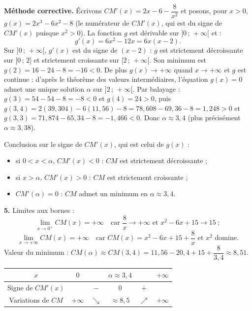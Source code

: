 \documentclass[11pt]{article}
\begin{document}
\begin{exoresolu}
\medskip
\textbf{Méthode corrective.} Écrivons $CM'(x) = 2x - 6 - \dfrac{8}{x^2}$ et posons, pour $x > 0$, $g(x) = 2x^3 - 6x^2 - 8$ (le numérateur de $CM'(x)$, qui est du signe de $CM'(x)$ puisque $x^2 > 0$). La fonction $g$ est dérivable sur $]0\,;\,+\infty[$ et :
\[ g'(x) = 6x^2 - 12x = 6x(x - 2). \]
Sur $]0\,;\,+\infty[$, $g'(x)$ est du signe de $(x-2)$ : $g$ est strictement décroissante sur $]0\,;\,2]$ et strictement croissante sur $[2\,;\,+\infty[$. Son minimum est $g(2) = 16 - 24 - 8 = -16 < 0$. De plus $g(x) \to +\infty$ quand $x \to +\infty$ et $g$ est continue : d'après le théorème des valeurs intermédiaires, l'équation $g(x) = 0$ admet une unique solution $\alpha$ sur $]2\,;\,+\infty[$. Par balayage : $g(3) = 54 - 54 - 8 = -8 < 0$ et $g(4) = 24 > 0$, puis $g(3{,}4) = 2(39{,}304) - 6(11{,}56) - 8 = 78{,}608 - 69{,}36 - 8 = 1{,}248 > 0$ et $g(3{,}3) = 71{,}874 - 65{,}34 - 8 = -1{,}466 < 0$. Donc $\alpha \approx 3{,}4$ (plus précisément $\alpha \approx 3{,}38$).

Conclusion sur le signe de $CM'(x)$, qui est celui de $g(x)$ :
\begin{itemize}
\item si $0 < x < \alpha$, $CM'(x) < 0$ : $CM$ est strictement décroissante ;
\item si $x > \alpha$, $CM'(x) > 0$ : $CM$ est strictement croissante ;
\item $CM'(\alpha) = 0$ : $CM$ admet un minimum en $\alpha \approx 3{,}4$.
\end{itemize}

\textbf{5.} Limites aux bornes :
\[ \lim_{x \to 0^+} CM(x) = +\infty \quad \text{car } \dfrac{8}{x} \to +\infty \text{ et } x^2 - 6x + 15 \to 15 \ ; \]
\[ \lim_{x \to +\infty} CM(x) = +\infty \quad \text{car } CM(x) = x^2 - 6x + 15 + \dfrac{8}{x} \text{ et } x^2 \text{ domine.} \]
Valeur du minimum : $CM(\alpha) \approx CM(3{,}4) = 11{,}56 - 20{,}4 + 15 + \dfrac{8}{3{,}4} \approx 8{,}51$.

\begin{center}
\begin{tabular}{|c|ccccc|}
\hline
$x$ & $0$ & & $\alpha \approx 3{,}4$ & & $+\infty$ \\
\hline
Signe de $CM'(x)$ & & $-$ & $0$ & $+$ & \\
\hline
Variations de $CM$ & $+\infty$ & $\searrow$ & $\approx 8{,}5$ & $\nearrow$ & $+\infty$ \\
\hline
\end{tabular}
\end{center}


\end{exoresolu}
\end{document}
